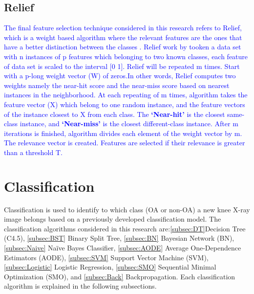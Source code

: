 \documentclass[review]{elsarticle}
\begin{document}
\subsection{Relief}
\label{subsec:Relief}
\textcolor{blue}{
The final feature selection technique considered in this research refers to Relief, which is a weight based algorithm where the relevant features are the ones that have a better distinction between the classes \cite{Kira1994}. Relief work by tooken a data set with n instances of p features which belonging to two known classes, each feature of data set is scaled to the interval [0 1]. Relief will be repeated m times. Start with a p-long weight vector (W) of zeros.In other words, Relief computes two weights namely the near-hit score and the near-miss score based on nearest instances in the neighborhood.
At each repeating of m times, algorithm takes the feature vector (X) which belong to one random instance, and the feature vectors of the instance closest to X  from each class. The \textbf{\lq Near-hit\rq} is the closest same-class instance, and \textbf{\lq Near-miss\rq} is the closest different-class instance. After m iterations is finished, algorithm divides each element of the weight vector by m. The relevance vector is created. Features are selected if their relevance is greater than a threshold T. }

 
\section{Classification}

Classification is used to identify to which class (OA or non-OA) a new knee X-ray image belongs based on a previously developed classification model. The classification algorithms considered in this research are:\ref{subsec:DT}Decision Tree (C4.5), \ref{subsec:BST} Binary Split Tree, \ref{subsec:BN} Bayesian Network (BN), \ref{subsec:Naive} Na\"ive Bayes Classifier, \ref{subsec:AODE} Average One-Dependence Estimators (AODE), \ref{subsec:SVM} Support Vector Machine (SVM), \ref{subsec:Logistic} Logistic Regression, \ref{subsec:SMO} Sequential Minimal Optimization (SMO), and \ref{subsec:Back} Backpropagation. Each classification algorithm is explained in the following subsections.
\end{document}
